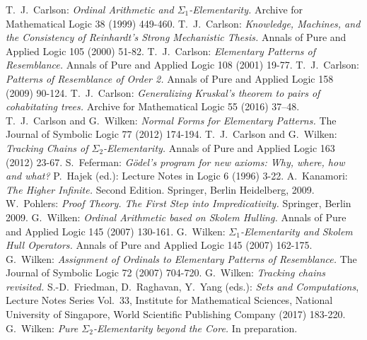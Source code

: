 \documentclass[3p,10pt,times]{elsarticle}
\begin{document}
\begin{thebibliography}{99}
 T.\ J.\ Carlson:
    \textit{Ordinal Arithmetic and $\Sigma_1$-Elementarity.}
    Archive for Mathematical Logic 38 (1999) 449-460.
 T.\ J.\ Carlson:
    \textit{Knowledge, Machines, and the Consistency of Reinhardt's Strong Mechanistic Thesis.}
    Annals of Pure and Applied Logic 105 (2000) 51-82. 
 T.\ J.\ Carlson:
    \textit{Elementary Patterns of Resemblance.}
    Annals of Pure and Applied Logic 108 (2001) 19-77.
 T.\ J.\ Carlson:
   \textit{Patterns of Resemblance of Order 2.}
    Annals of Pure and Applied Logic 158 (2009) 90-124.
 T.\ J.\ Carlson:
    \textit{Generalizing Kruskal's theorem to pairs of cohabitating trees.}
    Archive for Mathematical Logic 55 (2016) 37--48.
 T.\ J.\ Carlson and G.\ Wilken:
    \textit{Normal Forms for Elementary Patterns.}
    The Journal of Symbolic Logic 77 (2012) 174-194.
 T.\ J.\ Carlson and G.\ Wilken:
    \textit{Tracking Chains of $\Sigma_2$-Elementarity.}
    Annals of Pure and Applied Logic 163 (2012) 23-67.
 S.\ Feferman:    
    \textit{G\"odel's program for new axioms: Why, where, how and what?} 
    P.\ Hajek (ed.): Lecture Notes in Logic 6 (1996) 3-22.
 A.\ Kanamori:
    \textit{The Higher Infinite.}
     Second Edition. Springer, Berlin Heidelberg, 2009.
 W.\ Pohlers:
    \textit{Proof Theory. The First Step into Impredicativity.}
    Springer, Berlin 2009.
 G.\ Wilken:
    \textit{Ordinal Arithmetic based on Skolem Hulling.}
    Annals of Pure and Applied Logic 145 (2007) 130-161.
 G.\ Wilken:
    \textit{$\Sigma_1$-Elementarity and Skolem Hull Operators.}
    Annals of Pure and Applied Logic 145 (2007) 162-175.
 G.\ Wilken:
    \textit{Assignment of Ordinals to Elementary Patterns of Resemblance.}
    The Journal of Symbolic Logic 72 (2007) 704-720.
 G.\ Wilken:
    \textit{Tracking chains revisited.}
    S.-D.\ Friedman, D.\ Raghavan, Y.\ Yang (eds.): {\it Sets and Computations}, Lecture Notes Series Vol.\ 33, 
    Institute for Mathematical Sciences, National University of Singapore, World Scientific Publishing Company (2017) 183-220.
 G.\ Wilken:
    \textit{Pure $\Sigma_2$-Elementarity beyond the Core.}
    In preparation.    
\end{thebibliography}
\end{document}
